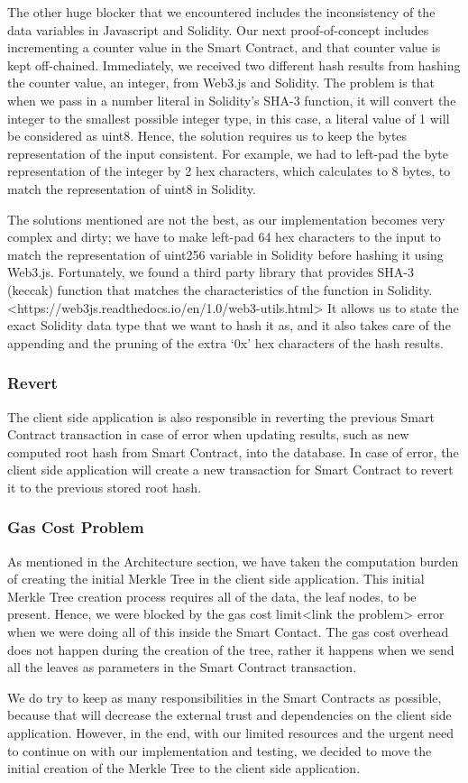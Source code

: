 The other huge blocker that we encountered includes the inconsistency of the data variables in Javascript and Solidity. Our next proof-of-concept includes incrementing a counter value in the Smart Contract, and that counter value is kept off-chained. Immediately, we received two different hash results from hashing the counter value, an integer, from Web3.js and Solidity. The problem is that when we pass in a number literal in Solidity’s SHA-3 function, it will convert the integer to the smallest possible integer type, in this case, a literal value of 1 will be considered as uint8. Hence, the solution requires us to keep the bytes representation of the input consistent. For example, we had to left-pad the byte representation of the integer by 2 hex characters, which calculates to 8 bytes, to match the representation of uint8 in Solidity. 

The solutions mentioned are not the best, as our implementation becomes very complex and dirty; we have to make left-pad 64 hex characters to the input to match the representation of uint256 variable in Solidity before hashing it using Web3.js. Fortunately, we found a third party library that provides SHA-3 (keccak) function that matches the characteristics of the function in Solidity. <https://web3js.readthedocs.io/en/1.0/web3-utils.html> It allows us to state the exact Solidity data type that we want to hash it as, and it also takes care of the appending and the pruning of the extra ‘0x’ hex characters of the hash results.

\subsubsection*{Revert}

The client side application is also responsible in reverting the previous Smart Contract transaction in case of error when updating results, such as new computed root hash from Smart Contract, into the database. In case of error, the client side application will create a new transaction for Smart Contract to revert it to the previous stored root hash.

\subsubsection*{Gas Cost Problem}

As mentioned in the Architecture section, we have taken the computation burden of creating the initial Merkle Tree in the client side application. This initial Merkle Tree creation process requires all of the data, the leaf nodes, to be present. Hence, we were blocked by the gas cost limit<link the problem> error when we were doing all of this inside the Smart Contact. The gas cost overhead does not happen during the creation of the tree, rather it happens when we send all the leaves as parameters in the Smart Contract transaction. 

We do try to keep as many responsibilities in the Smart Contracts as possible, because that will decrease the external trust and dependencies on the client side application. However, in the end, with our limited resources and the urgent need to continue on with our implementation and testing, we decided to move the initial creation of the Merkle Tree to the client side application.
